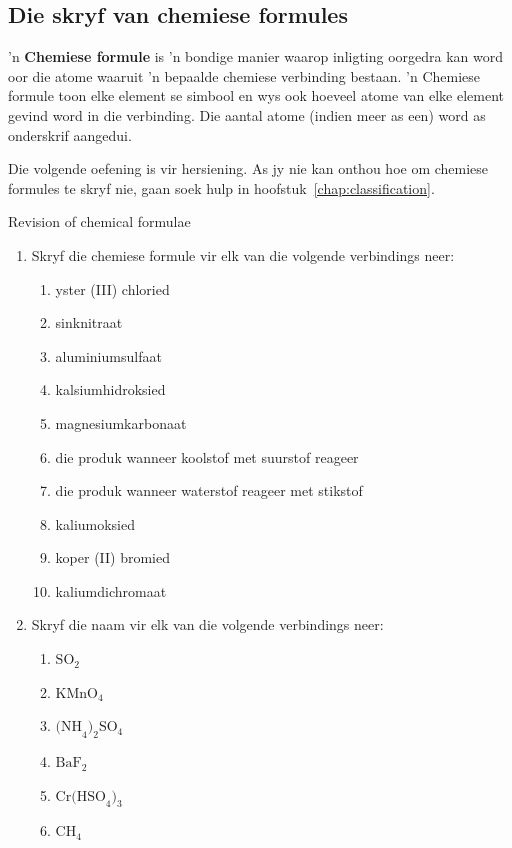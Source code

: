 \subsection*{Die skryf van chemiese formules}
\nopagebreak
\label{m38721*id62835} 'n \textbf{Chemiese formule} is 'n bondige manier waarop inligting oorgedra kan word oor die atome waaruit 'n bepaalde chemiese verbinding bestaan. 'n Chemiese formule toon elke element se simbool en wys ook hoeveel atome van elke element gevind word in die verbinding. Die aantal atome (indien meer as een) word as onderskrif aangedui.\par 
Die volgende oefening is vir hersiening. As jy nie kan onthou hoe om chemiese formules te skryf nie, gaan soek hulp in hoofstuk~\ref{chap:classification}.

\begin{exercises}{Revision of chemical formulae}
{
\begin{enumerate}[noitemsep, label=\textbf{\arabic*}.]
  \item Skryf die chemiese formule vir elk van die volgende verbindings neer:
\begin{enumerate}[noitemsep, label=\textbf{\alph*}. ]
 \item yster (III) chloried
\item sinknitraat
\item aluminiumsulfaat
\item kalsiumhidroksied
\item magnesiumkarbonaat
\item die produk wanneer koolstof met suurstof reageer
\item die produk wanneer waterstof reageer met stikstof
\item kaliumoksied
\item koper (II) bromied
\item kaliumdichromaat
\end{enumerate}
\item Skryf die naam vir elk van die volgende verbindings neer:
\begin{enumerate}[noitemsep, label=\textbf{\alph*}. ]
 \item $\text{SO}_2$
\item $\text{KMnO}_4$
\item $\text{(NH}_{4}\text{)}_{2}\text{SO}_{4}$
\item $\text{BaF}_2$
\item $\text{Cr(HSO}_{4}\text{)}_{3}$
\item $\text{CH}_{4}$
\end{enumerate}
\end{enumerate}

}
\end{exercises}

